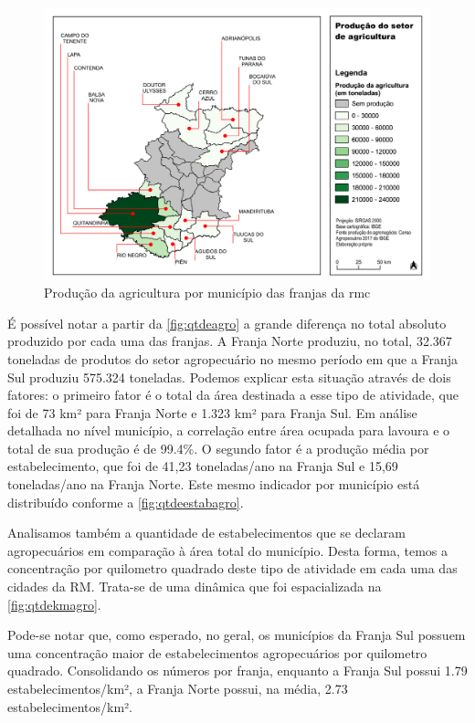 	\begin{landscape}
		\begin{figure}
			\centering
			\caption{Produção da agricultura por município das franjas da \gls{rmc}}
			\label{fig:qtdeagro}
			\includegraphics[width=0.85\linewidth]{../gis/produtos/RMC_censorural_QTDE_PRODUZIDA_AGRO}
		\end{figure}
	\end{landscape}
	
	É possível notar a partir da \autoref{fig:qtdeagro} a grande diferença no total absoluto produzido por cada uma das franjas. A Franja Norte produziu, no total, 32.367 toneladas de produtos do setor agropecuário no mesmo período em que a Franja Sul produziu 575.324 toneladas. Podemos explicar esta situação através de dois fatores: o primeiro fator é o total da área destinada a esse tipo de atividade, que foi de 73 km² para Franja Norte e 1.323 km² para Franja Sul. Em análise detalhada no nível município, a correlação entre área ocupada para lavoura e o total de sua produção é de 99.4\%. O segundo fator é a produção média por estabelecimento, que foi de 41,23 toneladas/ano na Franja Sul e 15,69 toneladas/ano na Franja Norte. Este mesmo indicador por município está distribuído conforme a \autoref{fig:qtdeestabagro}.
	
	Analisamos também a quantidade de estabelecimentos que se declaram agropecuários em comparação à área total do município. Desta forma, temos a concentração por quilometro quadrado deste tipo de atividade em cada uma das cidades da RM. Trata-se de uma dinâmica que foi espacializada na \autoref{fig:qtdekmagro}.
	
	Pode-se notar que, como esperado, no geral, os municípios da Franja Sul possuem uma concentração maior de estabelecimentos agropecuários por quilometro quadrado. Consolidando os números por franja, enquanto a Franja Sul possui 1.79 estabelecimentos/km², a Franja Norte possui, na média, 2.73 estabelecimentos/km². 
	
